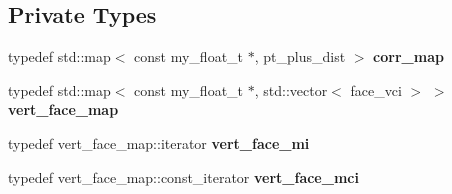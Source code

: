 \subsection*{Private Types}
\begin{CompactItemize}
\item 
typedef std::map$<$ const my\_\-float\_\-t $\ast$, pt\_\-plus\_\-dist $>$ \textbf{corr\_\-map}\label{classASCbase_1_1SimpleTrimesh_34f4df8be6ca27f3e8cd41c636ddbbde}

\item 
typedef std::map$<$ const my\_\-float\_\-t $\ast$, std::vector$<$ face\_\-vci $>$ $>$ \textbf{vert\_\-face\_\-map}\label{classASCbase_1_1SimpleTrimesh_00a413368aebdc035ace7e9327937c48}

\item 
typedef vert\_\-face\_\-map::iterator \textbf{vert\_\-face\_\-mi}\label{classASCbase_1_1SimpleTrimesh_2fa87e7c069e562d1761244b644fa746}

\item 
typedef vert\_\-face\_\-map::const\_\-iterator \textbf{vert\_\-face\_\-mci}\label{classASCbase_1_1SimpleTrimesh_0975a32279b1889f5a04d8d8613b28a6}

\end{CompactItemize}
